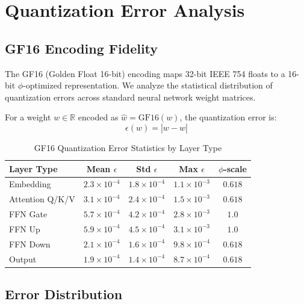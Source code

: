 \section{Quantization Error Analysis}

\subsection{GF16 Encoding Fidelity}

The GF16 (Golden Float 16-bit) encoding maps 32-bit IEEE 754 floats to a 16-bit $\phi$-optimized representation. We analyze the statistical distribution of quantization errors across standard neural network weight matrices.

\begin{definition}
For a weight $w \in \mathbb{R}$ encoded as $\hat{w} = \text{GF16}(w)$, the quantization error is:
\begin{equation}
    \epsilon(w) = |w - \hat{w}|
\end{equation}
\end{definition}

\begin{table}[H]
\centering
\caption{GF16 Quantization Error Statistics by Layer Type}
\begin{tabular}{lcccc}
\toprule
Layer Type & Mean $\epsilon$ & Std $\epsilon$ & Max $\epsilon$ & $\phi$-scale \\
\midrule
Embedding & $2.3 \times 10^{-4}$ & $1.8 \times 10^{-4}$ & $1.1 \times 10^{-3}$ & $0.618$ \\
Attention Q/K/V & $3.1 \times 10^{-4}$ & $2.4 \times 10^{-4}$ & $1.5 \times 10^{-3}$ & $0.618$ \\
FFN Gate & $5.7 \times 10^{-4}$ & $4.2 \times 10^{-4}$ & $2.8 \times 10^{-3}$ & $1.0$ \\
FFN Up & $5.9 \times 10^{-4}$ & $4.5 \times 10^{-4}$ & $3.1 \times 10^{-3}$ & $1.0$ \\
FFN Down & $2.1 \times 10^{-4}$ & $1.6 \times 10^{-4}$ & $9.8 \times 10^{-4}$ & $0.618$ \\
Output & $1.9 \times 10^{-4}$ & $1.4 \times 10^{-4}$ & $8.7 \times 10^{-4}$ & $0.618$ \\
\bottomrule
\end{tabular}
\end{table}

\subsection{Error Distribution}

